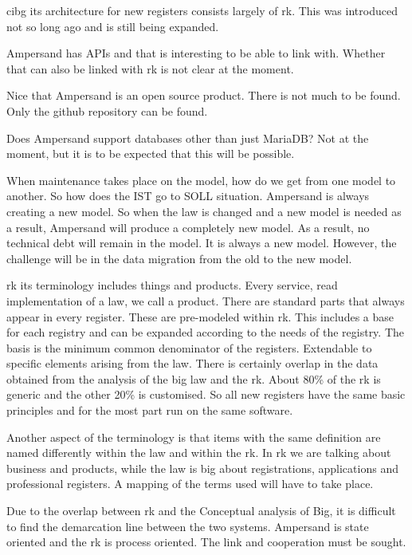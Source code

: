 {\acrshort{cibg} its architecture for new registers consists largely of \acrlong{rk}. 
This was introduced not so long ago and is still being expanded.}

{Ampersand has APIs and that is interesting to be able to link with. 
Whether that can also be linked with \acrlong{rk} is not clear at the moment.}

{Nice that Ampersand is an open source product. 
There is not much to be found. 
Only the github repository can be found.}

{Does Ampersand support databases other than just MariaDB? Not at the moment, but it is to be expected that this will be possible.}

{When maintenance takes place on the model, how do we get from one model to another. 
So how does the IST go to SOLL situation. 
Ampersand is always creating a new model. 
So when the law is changed and a new model is needed as a result, Ampersand will produce a completely new model. 
As a result, no technical debt will remain in the model.
It is always a new model. 
However, the challenge will be in the data migration from the old to the new model.}

{\acrlong{rk} its terminology includes things and products. 
Every service, read implementation of a law, we call a product. 
There are standard parts that always appear in every register. 
These are pre-modeled within \acrlong{rk}. 
This includes a base for each registry and can be expanded according to the needs of the registry. 
The basis is the minimum common denominator of the registers. 
Extendable to specific elements arising from the law. 
There is certainly overlap in the data obtained from the analysis of the big law and the \acrlong{rk}. 
About 80\% of the \acrlong{rk} is generic and the other 20\% is customised. 
So all new registers have the same basic principles and for the most part run on the same software.}

{Another aspect of the terminology is that items with the same definition are named differently within the law and within the \acrlong{rk}. In \acrlong{rk} we are talking about business and products, while the law is big about registrations, applications and professional registers. 
A mapping of the terms used will have to take place.}

{Due to the overlap between \acrlong{rk} and the Conceptual analysis of Big, it is difficult to find the demarcation line between the two systems. 
Ampersand is state oriented and the \acrlong{rk} is process oriented. 
The link and cooperation must be sought.}

